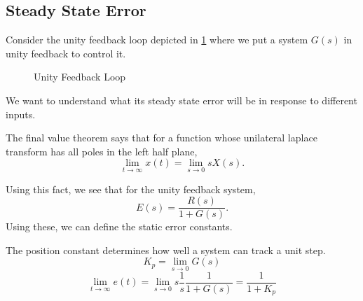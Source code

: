 \subsection{Steady State Error}
Consider the unity feedback loop depicted in \cref{fig:unity-feedback-loop} where we put a system $G(s)$ in unity feedback to control it.
\begin{gitbook-image}
\begin{figure}[H]
    \centering 
    \caption{Unity Feedback Loop}
    \label{fig:unity-feedback-loop}
\end{figure}
\end{gitbook-image}
We want to understand what its steady state error will be in response to different inputs.
\begin{theorem}
  The final value theorem says that for a function whose unilateral laplace transform has all poles in the left half plane,
  \[
	\lim_{t\to\infty}x(t) = \lim_{s\to0} sX(s).
  \]
  \label{thm:final-value-theorem}
\end{theorem}
Using this fact, we see that for the unity feedback system,
\[
  E(s) = \frac{R(s)}{1+G(s)}.
\]
Using these, we can define the static error constants.
\begin{definition}
  The position constant determines how well a system can track a unit step.
  \begin{equation}
	K_p = \lim_{s\to0}G(s)
	\label{eqn:position-constant}
  \end{equation}
  \[
	\lim_{t\to\infty} e(t) = \lim_{s\to0} s \frac{1}{s} \frac{1}{1+G(s)} = \frac{1}{1+K_p}
  \]
  \label{defn:position-constant}
\end{definition}
